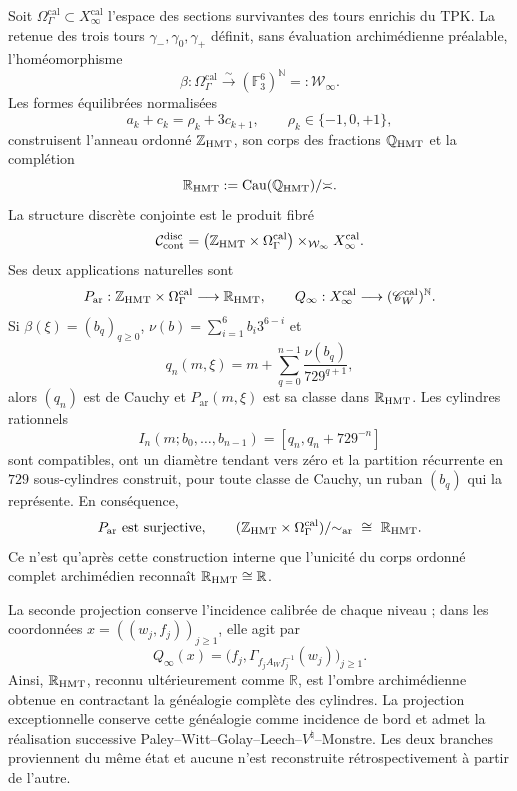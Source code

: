 \begin{theorem}
\label{thm:c27-tesis-rectora-doble-proyeccion}
Soit \(\Omega_\Gamma^{\mathrm{cal}}\subset
X_\infty^{\mathrm{cal}}\) l'espace des sections survivantes des
tours enrichis du TPK. La retenue des trois tours
\(\gamma_-,\gamma_0,\gamma_+\) définit, sans évaluation archimédienne préalable,
l'homéomorphisme
\[
 \beta:\Omega_\Gamma^{\mathrm{cal}}\xrightarrow{\ \sim\ }
 (\mathbb F_3^6)^{\mathbb N}=: \mathcal W_\infty.
\]
Les formes équilibrées normalisées
\[
 a_k+c_k=\rho_k+3c_{k+1},\qquad
 \rho_k\in\{-1,0,+1\},
\]
construisent l'anneau ordonné \(\mathbb Z_{\rm HMT}\), son corps des
fractions \(\mathbb Q_{\rm HMT}\) et la complétion
\[
 \mathbb R_{\rm HMT}:=
 \operatorname{Cau}(\mathbb Q_{\rm HMT})/{\asymp}.
\]
La structure discrète conjointe est le produit fibré
\[
\mathcal C_{\mathrm{cont}}^{\mathrm{disc}}
=\bigl(\mathbb Z_{\rm HMT}\times
\Omega_\Gamma^{\mathrm{cal}}\bigr)
\times_{\mathcal W_\infty}X_\infty^{\mathrm{cal}}.
\]
Ses deux applications naturelles sont
\[
 P_{\mathrm{ar}}:\mathbb Z_{\rm HMT}\times
 \Omega_\Gamma^{\mathrm{cal}}\longrightarrow\mathbb R_{\rm HMT},
 \qquad
 Q_\infty:X_\infty^{\mathrm{cal}}\longrightarrow
 (\mathscr C_W^{\mathrm{cal}})^{\mathbb N}.
\]
Si \(\beta(\xi)=(b_q)_{q\geq0}\),
\(\nu(b)=\sum_{i=1}^{6}b_i3^{6-i}\) et
\[
 q_n(m,\xi)=m+\sum_{q=0}^{n-1}
 \frac{\nu(b_q)}{729^{q+1}},
\]
alors \((q_n)\) est de Cauchy et \(P_{\mathrm{ar}}(m,\xi)\) est sa classe
dans \(\mathbb R_{\rm HMT}\). Les cylindres rationnels
\[
 I_n(m;b_0,\ldots,b_{n-1})=
 \left[q_n,q_n+729^{-n}\right]
\]
sont compatibles, ont un diamètre tendant vers zéro et la partition récurrente
en \(729\) sous-cylindres construit, pour toute classe de Cauchy, un ruban
\((b_q)\) qui la représente. En conséquence,
\[
 P_{\mathrm{ar}}\ \text{est surjective},\qquad
 (\mathbb Z_{\rm HMT}\times\Omega_\Gamma^{\mathrm{cal}})
 /{\sim_{\rm ar}}\ \cong\ \mathbb R_{\rm HMT}.
\]
Ce n'est qu'après cette construction interne que l'unicité du corps ordonné
complet archimédien reconnaît \(\mathbb R_{\rm HMT}\cong\mathbb R\).

La seconde projection conserve l'incidence calibrée de chaque niveau ; dans les
coordonnées \(x=((w_j,f_j))_{j\geq1}\), elle agit par
\[
 Q_\infty(x)
 =\bigl(f_j,\Gamma_{f_jA_Wf_j^{-1}}(w_j)\bigr)_{j\geq1}.
\]
Ainsi, \(\mathbb R_{\rm HMT}\), reconnu ultérieurement comme \(\mathbb R\),
est l'ombre archimédienne obtenue en contractant la généalogie complète des
cylindres. La projection exceptionnelle conserve cette généalogie comme incidence
de bord et admet la réalisation successive
Paley--Witt--Golay--Leech--\(V^\natural\)--Monstre. Les deux branches proviennent
du même état et aucune n'est reconstruite rétrospectivement à partir de l'autre.
\end{theorem}


